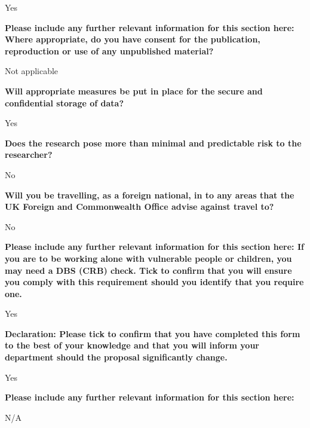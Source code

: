 Yes

\textbf{Please include any further relevant information for this section here: Where appropriate, do you have consent for the publication, reproduction or use of any unpublished material?}

Not applicable

\textbf{Will appropriate measures be put in place for the secure and confidential storage of data?}

Yes

\textbf{Does the research pose more than minimal and predictable risk to the researcher?}

No

\textbf{Will you be travelling, as a foreign national, in to any areas that the UK Foreign and Commonwealth Office advise against travel to?}

No

\textbf{Please include any further relevant information for this section here: If you are to be working alone with vulnerable people or children, you may need a DBS (CRB) check. Tick to confirm that you will ensure you comply with this requirement should you identify that you require one.}

Yes

\textbf{Declaration: Please tick to confirm that you have completed this form to the best of your knowledge and that you will inform your department should the proposal significantly change.}

Yes

\textbf{Please include any further relevant information for this section here:}

N/A